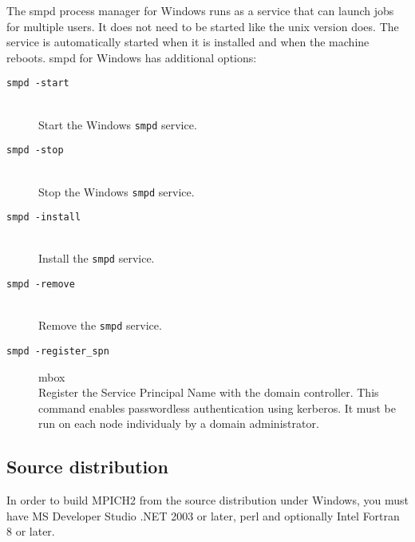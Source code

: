 \documentclass[dvipdfm,11pt]{article}
\begin{document}
The smpd process manager for Windows runs as a service that can launch jobs 
for multiple users.  It does not need to be started like the unix version 
does.  The service is automatically started when it is installed and when 
the machine reboots.  smpd for Windows has additional options:
\begin{description}
\item[\texttt{smpd -start}]\mbox{}\\
Start the Windows \texttt{smpd} service.
\item[\texttt{smpd -stop}]\mbox{}\\
Stop the Windows \texttt{smpd} service.
\item[\texttt{smpd -install}]\mbox{}\\
Install the \texttt{smpd} service.
\item[\texttt{smpd -remove}]\mbox{}\\
Remove the \texttt{smpd} service.
\item[\texttt{smpd -register\_spn}]mbox{}\\
Register the Service Principal Name with the domain controller.
This command enables passwordless authentication using kerberos.  It must be 
run on each node individualy by a domain administrator.
\end{description}

\subsection{Source distribution}
\label{sec:winsrc}

In order to build MPICH2 from the source distribution under Windows, 
you must have MS Developer Studio .NET 2003 or later, perl and optionally 
Intel Fortran 8 or later.
\end{document}
